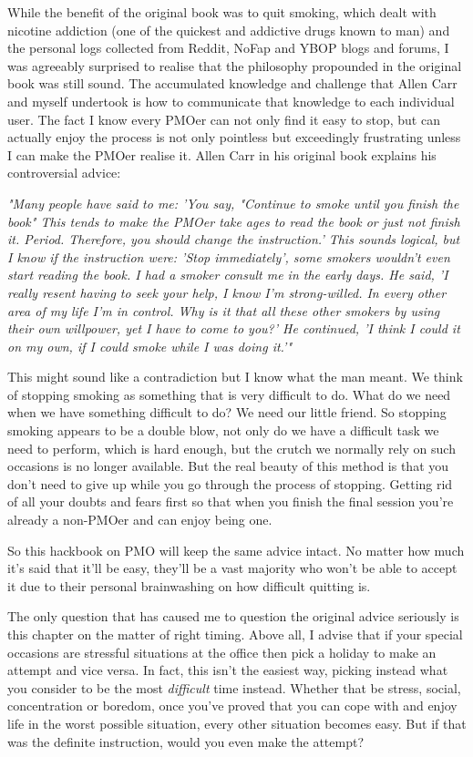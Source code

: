 \documentclass[easypeasy.tex]{subfiles}
\begin{document}
While the benefit of the original book was to quit smoking, which dealt with nicotine addiction (one of the quickest and addictive drugs known to man) and the personal logs collected from Reddit, NoFap and YBOP blogs and forums, I was agreeably surprised to realise that the philosophy propounded in the original book was still sound. The accumulated knowledge and challenge that Allen Carr and myself undertook is how to communicate that knowledge to each individual user. The fact I know every PMOer can not only find it easy to stop, but can actually enjoy the process is not only pointless but exceedingly frustrating unless I can make the PMOer realise it. Allen Carr in his original book explains his controversial advice:

  \textit{"Many people have said to me: 'You say, "Continue to smoke until you finish the book" This tends to make the PMOer take ages to read the book or just not finish it. Period. Therefore, you should change the instruction.' This sounds logical, but I know if the instruction were: 'Stop immediately', some smokers wouldn't even start reading the book. I had a smoker consult me in the early days. He said, 'I really resent having to seek your help, I know I'm strong-willed. In every other area of my life I'm in control. Why is it that all these other smokers by using their own willpower, yet I have to come to you?' He continued, 'I think I could it on my own, if I could smoke while I was doing it.'"}

This might sound like a contradiction but I know what the man meant. We think of stopping smoking as something that is very difficult to do. What do we need when we have something difficult to do? We need our little friend. So stopping smoking appears to be a double blow, not only do we have a difficult task we need to perform, which is hard enough, but the crutch we normally rely on such occasions is no longer available. But the real beauty of this method is that you don't need to give up while you go through the process of stopping. Getting rid of all your doubts and fears first so that when you finish the final session you're already a non-PMOer and can enjoy being one.

So this hackbook on PMO will keep the same advice intact. No matter how much it's said that it'll be easy, they'll be a vast majority who won't be able to accept it due to their personal brainwashing on how difficult quitting is.

The only question that has caused me to question the original advice seriously is this chapter on the matter of right timing. Above all, I advise that if your special occasions are stressful situations at the office then pick a holiday to make an attempt and vice versa. In fact, this isn't the easiest way, picking instead what you consider to be the most \textit{difficult} time instead. Whether that be stress, social, concentration or boredom, once you've proved that you can cope with and enjoy life in the worst possible situation, every other situation becomes easy. But if that was the definite instruction, would you even make the attempt?
\end{document}
